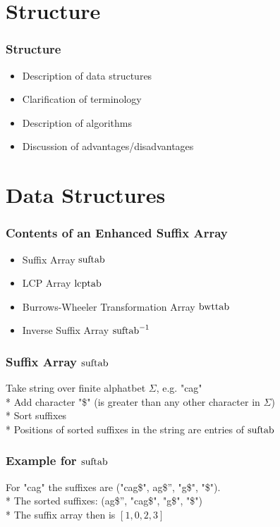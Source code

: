 \documentclass[compress,handout]{beamer} %
\begin{document}
\section{Structure}

\begin{frame}
	\frametitle{Structure}
	\begin{itemize}
		\item Description of data structures
		\item Clarification of terminology
		\item Description of algorithms
		\item Discussion of advantages/disadvantages
	\end{itemize}
\end{frame}

\section{Data Structures}

\begin{frame}
	\frametitle{Contents of an Enhanced Suffix Array}
	\begin{itemize}
		\item Suffix Array $\hbox{suftab}$
		\item LCP Array $\hbox{lcptab}$
		\item Burrows-Wheeler Transformation Array $\hbox{bwttab}$
		\item Inverse Suffix Array $\hbox{suftab}^{-1}$
	\end{itemize}
\end{frame}

\begin{frame}
	\frametitle{Suffix Array $\hbox{suftab}$}
	Take string over finite alphatbet $\Sigma$, e.g. "cag" \\*
	Add character "\$" (is greater than any other character in $\Sigma$) \\*
	Sort suffixes \\*
	Positions of sorted suffixes in the string are entries of $\hbox{suftab}$
\end{frame}

\begin{frame}
	\frametitle{Example for $\hbox{suftab}$}
	For "cag" the suffixes are ("cag\$", \dq ag\$'', "g\$", "\$"). \\*
	The sorted suffixes: (\dq ag\$'', "cag\$", "g\$", "\$") \\*
	The suffix array then is $[1, 0, 2, 3]$
\end{frame}
\end{document}
